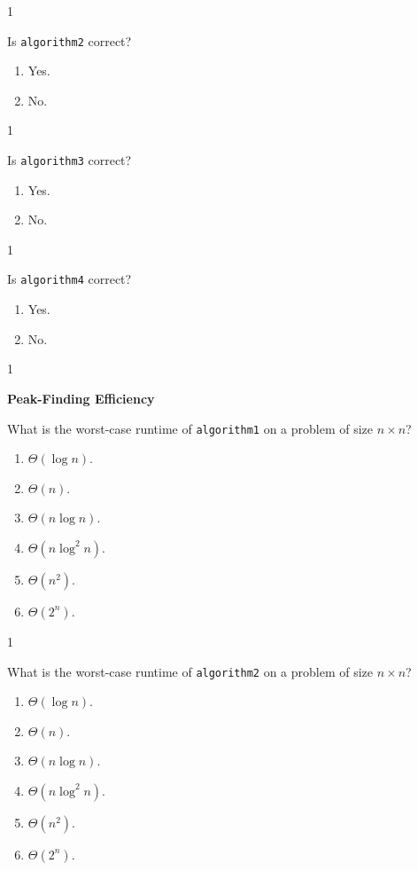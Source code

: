 \documentclass[12pt,twoside]{article}
\begin{document}
\begin{exercises}
\begin{problemparts}
\ifsolution \solution{}
1
\fi

\problempart {} Is \texttt{algorithm2} correct?
\begin{enumerate}
\item Yes.
\item No.
\end{enumerate}

\ifsolution \solution{}
1
\fi

\problempart {} Is \texttt{algorithm3} correct?
\begin{enumerate}
\item Yes.
\item No.
\end{enumerate}

\ifsolution \solution{}
1
\fi

\problempart {} Is \texttt{algorithm4} correct?
\begin{enumerate}
\item Yes.
\item No.
\end{enumerate}

\ifsolution \solution{}
1
\fi

\end{problemparts}

\problem {} \textbf{Peak-Finding Efficiency}

\begin{problemparts}

\problempart {} What is the worst-case runtime of \texttt{algorithm1} on a problem of size $n \times n$?
\begin{enumerate}
\item $\Theta(\log n)$.
\item $\Theta(n)$.
\item $\Theta(n \log n)$.
\item $\Theta(n \log^2 n)$.
\item $\Theta(n^2)$.
\item $\Theta(2^n)$.
\end{enumerate}

\ifsolution \solution{}
1
\fi

\problempart {} What is the worst-case runtime of \texttt{algorithm2} on a problem of size $n \times n$?
\begin{enumerate}
\item $\Theta(\log n)$.
\item $\Theta(n)$.
\item $\Theta(n \log n)$.
\item $\Theta(n \log^2 n)$.
\item $\Theta(n^2)$.
\item $\Theta(2^n)$.
\end{enumerate}


\end{problemparts}
\end{exercises}
\end{document}
